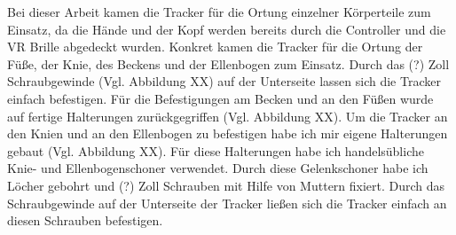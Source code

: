 \newline
Bei dieser Arbeit kamen die Tracker für die Ortung einzelner Körperteile zum Einsatz, da die Hände und der Kopf werden bereits durch die Controller und die VR Brille abgedeckt wurden. Konkret kamen die Tracker für die Ortung der Füße, der Knie, des Beckens und der Ellenbogen zum Einsatz.
\newline
Durch das (?) Zoll Schraubgewinde (Vgl. Abbildung XX) auf der Unterseite lassen sich die Tracker einfach befestigen. Für die Befestigungen am Becken und an den Füßen wurde auf fertige Halterungen zurückgegriffen (Vgl. Abbildung XX). Um die Tracker an den Knien und an den Ellenbogen zu befestigen habe ich mir eigene Halterungen gebaut (Vgl. Abbildung XX). Für diese Halterungen habe ich handelsübliche Knie- und Ellenbogenschoner verwendet. Durch diese Gelenkschoner habe ich Löcher gebohrt und (?) Zoll Schrauben mit Hilfe von Muttern fixiert. Durch das Schraubgewinde auf der Unterseite der Tracker ließen sich die Tracker einfach an diesen Schrauben befestigen.


